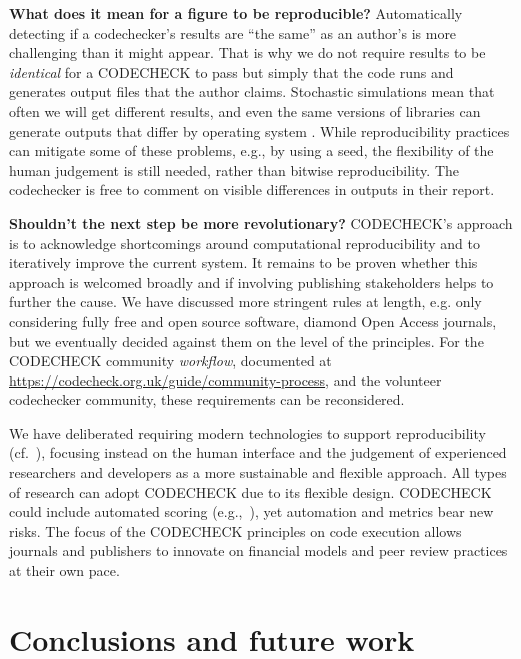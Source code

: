 \documentclass[12pt]{article}
\newcommand{\rev}[1]{\textit{#1}}
\begin{document}
\textbf{What does it mean for a figure to be reproducible?}
Automatically detecting if a codechecker's results are ``the same'' as
an author's is more challenging than it might appear.  That is why we
do not require results to be \textit{identical} for a CODECHECK to
pass but simply that the code runs and generates output files that the
author claims. Stochastic simulations mean that often we will get
different results, and even the same versions of libraries can
generate outputs that differ by operating system
\cite{Gronenschild2012-pp}.  While reproducibility practices can
mitigate some of these problems, e.g., by using a seed, the
flexibility of the human judgement is still needed, rather than
bitwise reproducibility.  The codechecker is free to comment on
visible differences in outputs in their report.

\textbf{Shouldn't the next step be more revolutionary?}  CODECHECK's
approach is to acknowledge shortcomings around computational
reproducibility and to iteratively improve the current system.  It
remains to be proven whether this approach is welcomed broadly and if
involving publishing stakeholders helps to further the cause.  We have
discussed more stringent rules at length, e.g. only considering fully
free and open source software, diamond Open Access journals, but we
eventually decided against them on the level of the principles.  For
the CODECHECK community
\rev{workflow}, documented at
\url{https://codecheck.org.uk/guide/community-process},
and the volunteer codechecker community, these requirements can be 
reconsidered.

We have deliberated requiring modern technologies to support
reproducibility (cf.~\cite{konkol_publishing_2020}), 
focusing instead on the human interface and the judgement of experienced
researchers and developers as a more sustainable and flexible
approach.  All types of research can adopt CODECHECK due to its
flexible design.  CODECHECK could include automated scoring
(e.g.,~\cite{menke_rigor_2020}), yet automation and metrics bear new
risks.  The focus of the CODECHECK principles on code execution allows
journals and publishers to innovate on financial models and peer
review practices at their own pace.

\section*{Conclusions and future work}\label{future-work-and-conclusions}
\end{document}
